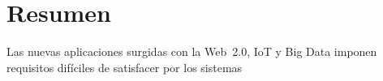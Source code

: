 \chapter*{Resumen\label{cap:01summary}}

Las nuevas aplicaciones surgidas con la Web~2.0, IoT y Big Data imponen
requisitos difíciles de satisfacer por los sistemas

